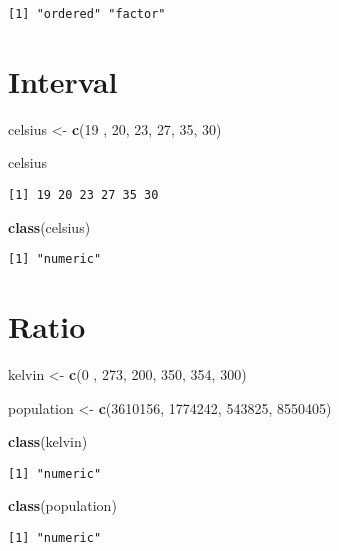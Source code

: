 \documentclass[]{book}
\newenvironment{Shaded}{\begin{snugshade}}{\end{snugshade}}
\newcommand{\KeywordTok}[1]{\textcolor[rgb]{0.13,0.29,0.53}{\textbf{#1}}}
\newcommand{\DecValTok}[1]{\textcolor[rgb]{0.00,0.00,0.81}{#1}}
\newcommand{\StringTok}[1]{\textcolor[rgb]{0.31,0.60,0.02}{#1}}
\newcommand{\NormalTok}[1]{#1}
\theoremstyle{definition}
\theoremstyle{definition}
\theoremstyle{definition}
\theoremstyle{remark}
\begin{document}
\begin{verbatim}
[1] "ordered" "factor" 
\end{verbatim}

\section{Interval}\label{interval}

\begin{Shaded}
\begin{Highlighting}[]
\NormalTok{celsius <-}\StringTok{ }\KeywordTok{c}\NormalTok{(}\DecValTok{19}\NormalTok{ , }\DecValTok{20}\NormalTok{, }\DecValTok{23}\NormalTok{, }\DecValTok{27}\NormalTok{, }\DecValTok{35}\NormalTok{, }\DecValTok{30}\NormalTok{)}

\NormalTok{celsius}
\end{Highlighting}
\end{Shaded}

\begin{verbatim}
[1] 19 20 23 27 35 30
\end{verbatim}

\begin{Shaded}
\begin{Highlighting}[]
\KeywordTok{class}\NormalTok{(celsius)}
\end{Highlighting}
\end{Shaded}

\begin{verbatim}
[1] "numeric"
\end{verbatim}

\section{Ratio}\label{ratio}

\begin{Shaded}
\begin{Highlighting}[]
\NormalTok{kelvin <-}\StringTok{ }\KeywordTok{c}\NormalTok{(}\DecValTok{0}\NormalTok{ , }\DecValTok{273}\NormalTok{, }\DecValTok{200}\NormalTok{, }\DecValTok{350}\NormalTok{, }\DecValTok{354}\NormalTok{, }\DecValTok{300}\NormalTok{)}

\NormalTok{population <-}\StringTok{ }\KeywordTok{c}\NormalTok{(}\DecValTok{3610156}\NormalTok{, }\DecValTok{1774242}\NormalTok{, }\DecValTok{543825}\NormalTok{, }\DecValTok{8550405}\NormalTok{)}

\KeywordTok{class}\NormalTok{(kelvin)}
\end{Highlighting}
\end{Shaded}

\begin{verbatim}
[1] "numeric"
\end{verbatim}

\begin{Shaded}
\begin{Highlighting}[]
\KeywordTok{class}\NormalTok{(population)}
\end{Highlighting}
\end{Shaded}

\begin{verbatim}
[1] "numeric"
\end{verbatim}


\end{document}
